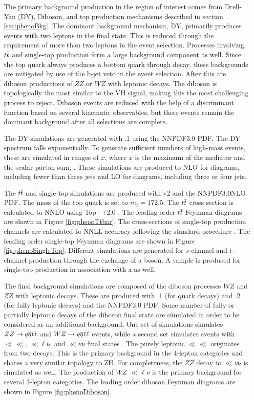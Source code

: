 The primary background production in the region of interest comes from Drell-Yan (DY), Diboson, and top production mechanisms described in section \ref{sec:phenoBkg}.
The dominant background mechanism, DY, primarily produces events with two leptons in the final state.
This is reduced through the requirement of more than two leptons in the event selection.
Processes involving $t\overline{t}$ and single-top production form a large background component as well.
Since the top quark always produces a bottom quark through decay, these backgrounds are mitigated by use of the b-jet veto in the event selection.
After this are diboson productions of $ZZ$ or $WZ$ with leptonic decays.
The diboson is topologically the most similar to the VH signal, making this the most challenging process to reject.
Diboson events are reduced with the help of a discriminant function based on several kinematic observables, but these events remain the dominant background after all selections are complete.

The DY simulations are generated with .1 using the NNPDF3.0 PDF.
The DY \muu spectrum falls exponentially.
To generate sufficient numbers of high-mass events, these are simulated in ranges of $x$, where $x$ is the maximum of the mediator \pt and the scalar parton \pt sum, \httt.
These simulations are produced to NLO for diagrams, including fewer than three jets and LO for diagrams, including three or four jets.

The $t\overline{t}$ and single-top simulations are produced with \powheg v2 and the NNPDF3.0NLO PDF.
The mass of the top quark is set to $m_t=172.5$.
The $t\overline{t}$ cross section is calculated to NNLO using Top++2.0 \cite{Czakon:2011xx}.
The leading order $t\overline{t}$ Feynman diagrams are shown in Figure \ref{fig:phenoTtbar}.
The cross-sections of single-top production channels are calculated to NNLL accuracy following the standard procedure \cite{Kidonakis:2011wy, Kidonakis:2010ux}.
The leading order single-top Feynman diagrams are shown in Figure \ref{fig:phenoSingleTop}.
Different simulations are generated for $s$-channel and $t$-channel production through the exchange of a \W boson. A sample is produced for single-top production in association with a \W as well.

The final background simulations are composed of the diboson processes $WZ$ and $ZZ$ with leptonic decays.
These are produced with .1 (for quark decays) and .2 (for fully leptonic decays) and the NNPDF3.0 PDF.
Some number of fully or partially leptonic decays of the diboson final state are simulated in order to be considered as an additional background.
One set of simulations simulates $ZZ\to q\overline{q}\ell\ell$ and $WZ\to q\overline{q}\ell\ell$ events, while a second set simulates events with $\ll\ll$, $\ll\ell\nu$, and $\ll\nu\nu$ final states \cite{ATL-PHYS-PUB-2017-005}.
The purely leptonic $\ll\ll$ originates from two \Z decays.
This is the primary background in the 4-lepton categories and shares a very similar topology to ZH.
For completeness, the $ZZ$ decay to $\ll\nu\nu$ is simulated as well.
The production of $WZ$ $\ll\ell\nu$ is the primary background for several 3-lepton categories.
The leading order diboson Feynman diagrams are shown in Figure \ref{fig:phenoDiboson}.

